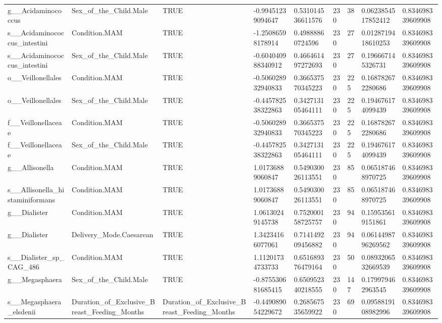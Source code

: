 \begin{longtable}{lllllllll}
g\_\_Acidaminococcus & Sex\_of\_the\_Child.Male & TRUE & -0.99451239094647 & 0.531014536611576 & 230 & 38 & 0.0623854517852412 & 0.834698339609908 \\
s\_\_Acidaminococcus\_intestini & Condition.MAM & TRUE & -1.25086598178914 & 0.49888860724596 & 230 & 27 & 0.0128719418610253 & 0.834698339609908 \\
s\_\_Acidaminococcus\_intestini & Sex\_of\_the\_Child.Male & TRUE & -0.604040988340912 & 0.466461497272693 & 230 & 27 & 0.196667145326731 & 0.834698339609908 \\
o\_\_Veillonellales & Condition.MAM & TRUE & -0.506028932940833 & 0.366537570345223 & 230 & 225 & 0.168782672280686 & 0.834698339609908 \\
o\_\_Veillonellales & Sex\_of\_the\_Child.Male & TRUE & -0.445782538322863 & 0.342713105464111 & 230 & 225 & 0.194676174099439 & 0.834698339609908 \\
f\_\_Veillonellaceae & Condition.MAM & TRUE & -0.506028932940833 & 0.366537570345223 & 230 & 225 & 0.168782672280686 & 0.834698339609908 \\
f\_\_Veillonellaceae & Sex\_of\_the\_Child.Male & TRUE & -0.445782538322863 & 0.342713105464111 & 230 & 225 & 0.194676174099439 & 0.834698339609908 \\
g\_\_Allisonella & Condition.MAM & TRUE & 1.01736889060847 & 0.549030026113551 & 230 & 85 & 0.065187468970725 & 0.834698339609908 \\
s\_\_Allisonella\_histaminiformans & Condition.MAM & TRUE & 1.01736889060847 & 0.549030026113551 & 230 & 85 & 0.065187468970725 & 0.834698339609908 \\
g\_\_Dialister & Condition.MAM & TRUE & 1.06130249145738 & 0.752000158725757 & 230 & 94 & 0.159535619151861 & 0.834698339609908 \\
g\_\_Dialister & Delivery\_Mode.Caesarean & TRUE & 1.34234166077061 & 0.714149209456882 & 230 & 94 & 0.0614498796269562 & 0.834698339609908 \\
s\_\_Dialister\_sp\_CAG\_486 & Condition.MAM & TRUE & 1.11201734733733 & 0.651689376479164 & 230 & 50 & 0.0893206532669539 & 0.834698339609908 \\
g\_\_Megasphaera & Sex\_of\_the\_Child.Male & TRUE & -0.875530681685415 & 0.650952340218555 & 230 & 147 & 0.179979462963545 & 0.834698339609908 \\
s\_\_Megasphaera\_elsdenii & Duration\_of\_Exclusive\_Breast\_Feeding\_Months & Duration\_of\_Exclusive\_Breast\_Feeding\_Months & -0.449089054229672 & 0.268567535659922 & 230 & 69 & 0.0958819108982996 & 0.834698339609908 \\

\end{longtable}
